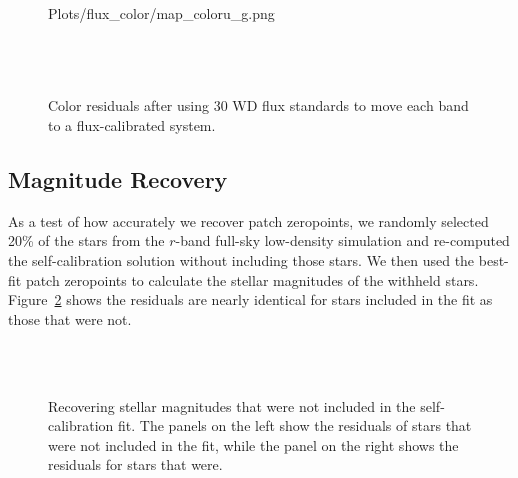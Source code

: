\documentclass[12pt,preprint]{aastex}
\begin{document}





\begin{figure}
 {Plots/flux_color/map_coloru_g.png} \\
 \\
 \\
 \\
\caption{Color residuals after using 30 WD flux standards to move each band to a flux-calibrated system.   \label{fig:colorcolor}}
\end{figure}

\subsection{Magnitude Recovery}
As a test of how accurately we recover patch zeropoints, we randomly selected 20\% of the stars from the $r$-band full-sky low-density simulation and re-computed the self-calibration solution without including those stars.  We then used the best-fit patch zeropoints to calculate the stellar magnitudes of the withheld stars.  Figure~\ref{fig:zpcheck} shows the residuals are nearly identical for stars included in the fit as those that were not.  


\begin{figure}
 \\
 \\
\caption{Recovering stellar magnitudes that were not included in the self-calibration fit.  The panels on the left show the residuals of stars that were not included in the fit, while the panel on the right shows the residuals for stars that were.  \label{fig:zpcheck}}
\end{figure}
\end{document}
